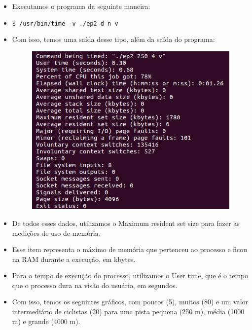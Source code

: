 \documentclass{beamer}
\begin{document}
\begin{frame}
	\begin{itemize}
		\item Executamos o programa da seguinte maneira:
		\item \quad \texttt{\$ /usr/bin/time -v ./ep2 d n v}
		\item Com isso, temos uma saída desse tipo, além da saída do programa:
		\begin{figure}[!h]
			\centering
			\includegraphics[scale=0.4]{4.png}
		\end{figure}
	\end{itemize}
\end{frame}

\begin{frame}
	\begin{itemize}
		\item De todos esses dados, utilizamos o Maximum resident set size para fazer as medições de uso de memória.
		\item Esse item representa o máximo de memória que pertenceu ao processo e ficou na RAM durante a execução, em kbytes.
		\item Para o tempo de execução do processo, utilizamos o User time, que é o tempo que o processo dura na visão do usuário, em segundos.
		\item Com isso, temos os seguintes gráficos, com poucos (5), muitos (80) e um valor intermediário de ciclistas (20) para uma pista pequena (250 m), média (1000 m) e grande (4000 m).
	\end{itemize}
\end{frame}
\end{document}

